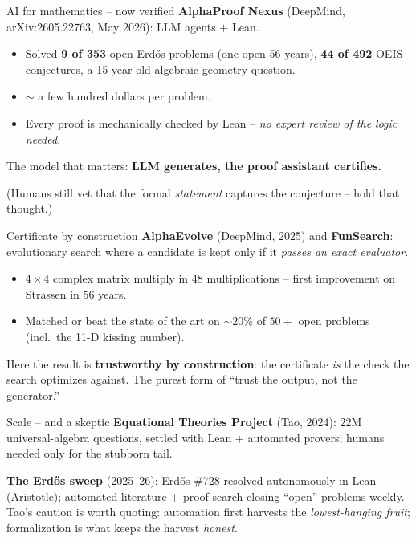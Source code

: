 \documentclass[aspectratio=169,xcolor=dvipsnames]{beamer}
\def\p{\\[0.1in] \pause}
\begin{document}
\begin{frame}{AI for mathematics -- now verified}
\textbf{AlphaProof Nexus} (DeepMind, arXiv:2605.22763, May 2026): LLM agents $+$ Lean.
\begin{itemize}
  \item Solved \textbf{9 of 353} open Erd\H{o}s problems (one open 56 years),
        \textbf{44 of 492} OEIS conjectures, a 15-year-old algebraic-geometry question.
  \item $\sim$ a few hundred dollars per problem.
  \item Every proof is mechanically checked by Lean -- \emph{no expert review of the logic needed}.
\end{itemize} \pause
\smallskip
The model that matters: \textbf{LLM generates, the proof assistant certifies.} \p

(Humans still vet that the formal \emph{statement} captures the conjecture -- hold that thought.)
\end{frame}

\begin{frame}{Certificate by construction}
\textbf{AlphaEvolve} (DeepMind, 2025) and \textbf{FunSearch}: evolutionary search where a
candidate is kept only if it \emph{passes an exact evaluator}.
\begin{itemize}
  \item $4\times4$ complex matrix multiply in 48 multiplications -- first improvement on
        Strassen in 56 years.
  \item Matched or beat the state of the art on $\sim 20\%$ of $50+$ open problems
        (incl.\ the 11-D kissing number).
\end{itemize} \pause
\smallskip
Here the result is \textbf{trustworthy by construction}: the certificate \emph{is} the check
the search optimizes against.  The purest form of ``trust the output, not the generator.''
\end{frame}

\begin{frame}{Scale -- and a skeptic}
\textbf{Equational Theories Project} (Tao, 2024): $22$M universal-algebra questions,
settled with Lean + automated provers; humans needed only for the stubborn tail. \p

\textbf{The Erd\H{o}s sweep} (2025--26): Erd\H{o}s \#728 resolved autonomously in Lean
(Aristotle); automated literature + proof search closing ``open'' problems weekly. \p
\pause
Tao's caution is worth quoting: automation first harvests the \emph{lowest-hanging fruit};
formalization is what keeps the harvest \emph{honest}.
\end{frame}
\end{document}
